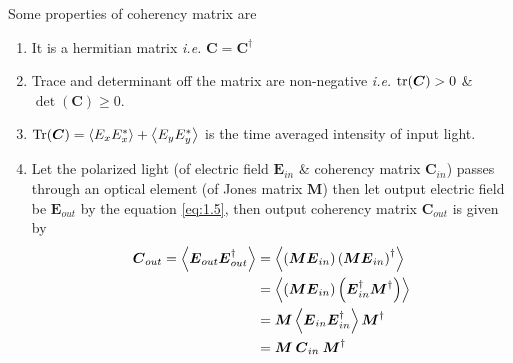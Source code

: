 \documentclass[11pt,a4paper]{article}
\numberwithin{equation}{section}
\begin{document}
Some properties of coherency matrix are
\begin{enumerate}
	\item It is a hermitian matrix \textit{i.e.} $\boldsymbol{C}=\boldsymbol{C}^\dagger$
	\item Trace and determinant off the matrix are non-negative \textit{i.e.} $\tr(\boldsymbol{C})>0$ \& $\det(\boldsymbol{C})\ge0$.
	\item $\Tr(\boldsymbol{C}) = \expval{E_x E_x^\ast} +\expval{E_y E_y^\ast}$ is the time averaged intensity of input light.
	\item Let the polarized light (of electric field $\boldsymbol{E}_{in}$ \& coherency matrix $\boldsymbol{C}_{in}$) passes through an optical element (of Jones matrix $\boldsymbol{M}$) then let output electric field be $\boldsymbol{E}_{out}$ by the equation \ref{eq:1.5}, then output coherency matrix $\boldsymbol{C}_{out}$ is given by 
	\begin{align}
		\boldsymbol{C}_{out} = \expval{\boldsymbol{E}_{out}\boldsymbol{E}_{out}^\dagger} &= \expval{\left(\boldsymbol{M}\boldsymbol{E}_{in} \right) \left(\boldsymbol{M}\boldsymbol{E}_{in}\right)^\dagger}\nonumber\\
		&= \expval{\left(\boldsymbol{M}\boldsymbol{E}_{in} \right) \left(\boldsymbol{E}_{in}^\dagger\boldsymbol{M}^\dagger\right)}\nonumber \\
		&= \boldsymbol{M}\expval{\boldsymbol{E}_{in} \boldsymbol{E}_{in}^\dagger}\boldsymbol{M}^\dagger \nonumber\\
		&= \boldsymbol{M}\:\boldsymbol{C}_{in}\:\boldsymbol{M}^\dagger \label{eq:1.10}
	\end{align}
\end{enumerate}
\end{document}
